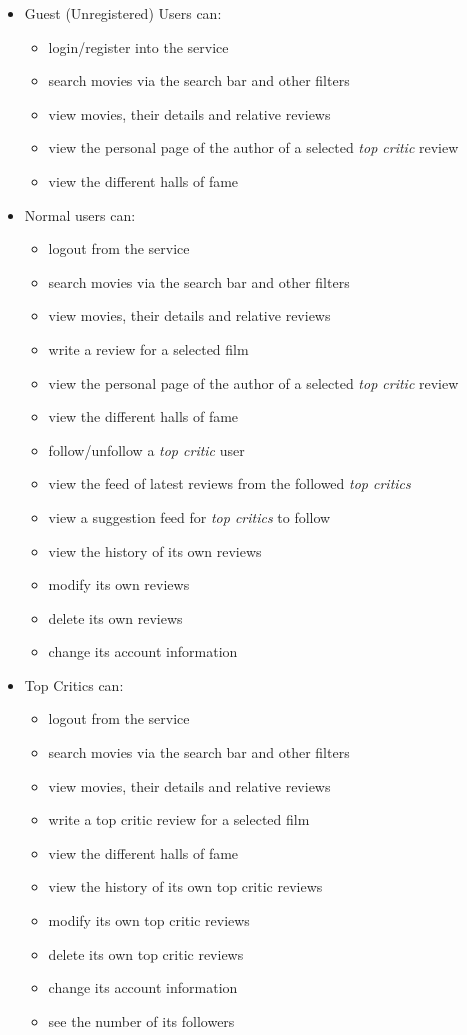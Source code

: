 \begin{itemize}
	\item Guest (Unregistered) Users can:
	\begin{itemize}
		\item login/register into the service
		\item search movies via the search bar and other filters
		\item view movies, their details and relative reviews
		\item view the personal page of the author of a selected \emph{top critic} review
		\item view the different halls of fame
	\end{itemize}

	
	\item Normal users can:
	\begin{itemize}
		\item logout from the service
		\item search movies via the search bar and other filters
		\item view movies, their details and relative reviews
		\item write a review for a selected film
		\item view the personal page of the author of a selected \emph{top critic} review
		\item view the different halls of fame
		\item follow\slash unfollow a \emph{top critic} user
		\item view the feed of latest reviews from the followed \emph{top critics}
		\item view a suggestion feed for \emph{top critics} to follow
		\item view the history of its own reviews
		\item modify its own reviews
		\item delete its own reviews
		\item change its account information
		
	\end{itemize}
	
	\item Top Critics can:
	\begin{itemize}
		\item logout from the service
		\item search movies via the search bar and other filters
		\item view movies, their details and relative reviews
		\item write a top critic review for a selected film
		\item view the different halls of fame
		\item view the history of its own top critic reviews
		\item modify its own top critic reviews
		\item delete its own top critic reviews
		\item change its account information
		\item see the number of its followers
		

\end{itemize}
\end{itemize}
